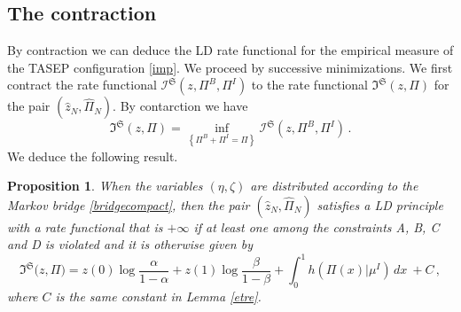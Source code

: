 \documentclass[reqno]{amsart}
\theoremstyle{plain}
\newtheorem{proposition}[theorem]{Proposition}
\theoremstyle{definition}
\theoremstyle{remark}
\numberwithin{equation}{section}
\numberwithin{theorem}{section}
\renewcommand{\hat}{\widehat}
\newcommand{\<}{\langle}
\renewcommand{\>}{\rangle}
\begin{document}
	
	
	\subsection{The contraction}
	
	By contraction we can deduce the LD rate functional for the empirical measure of the TASEP configuration \eqref{imp}. We proceed by successive minimizations. We first contract the rate functional $\mathcal I^{\mathfrak S}(z,\Pi^B,\Pi^I)$ to the rate functional $\mathfrak I^{\mathfrak S}(z,\Pi)$ for the pair $\left(\hat z_N,\hat{\Pi}_N\right)$. By contarction we have 
	\begin{equation}\label{contr}
		\mathfrak I^{\mathfrak S}(z,\Pi)=\inf_{\left\{\Pi^B+\Pi^I=\Pi\right\}} \mathcal I^{\mathfrak S}(z,\Pi^B,\Pi^I)\,.
	\end{equation}
	We deduce the following result.
	\begin{proposition}\label{nonholeta}
		When the variables $(\eta,\zeta)$ are distributed according to the Markov bridge \eqref{bridgecompact}, then the pair $\left(\hat z_N,\hat{\Pi}_N\right)$  satisfies a LD principle with a rate functional that is $+\infty$ if at least one among the constraints A, B, C and D is violated and it is otherwise given by
		\begin{equation}\label{mirt}
			\mathfrak I^{\mathfrak S}\Big(z,\Pi\Big)=z(0)\log\frac{\alpha}{1-\alpha}+z(1)\log\frac{\beta}{1-\beta}+\int_0^1 h\left(\Pi(x)|\mu^I\right)\, dx\ +C\,,
		\end{equation}
		where $C$ is the same constant in Lemma \ref{etre}.
	\end{proposition}
\end{document}
